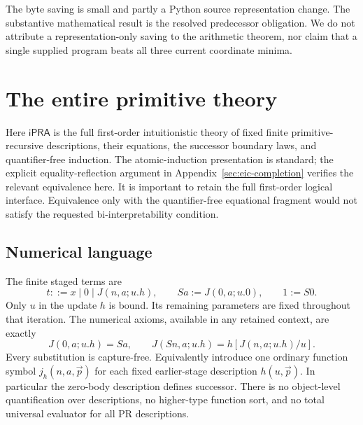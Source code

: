 \documentclass[11pt,letterpaper]{article}
\theoremstyle{definition}\newtheorem{definition}[theorem]{Definition}
\theoremstyle{remark}\newtheorem{remark}[theorem]{Remark}
\newcommand{\ipra}{\mathsf{iPRA}}
\begin{document}
The byte saving is small and partly a Python source representation change.
The substantive mathematical result is the resolved predecessor
obligation. We do not attribute a representation-only saving to the
arithmetic theorem, nor claim that a single supplied program beats all
three current coordinate minima.

\section{The entire primitive theory}
\label{sec:primitive}

Here $\ipra$ is the full first-order intuitionistic theory of fixed finite
primitive-recursive descriptions, their equations, the successor boundary
laws, and quantifier-free induction. The atomic-induction presentation is
standard\cite{salehi}; the explicit equality-reflection argument in
Appendix~\ref{sec:eic-completion} verifies the relevant equivalence here.
It is important to retain the full first-order logical interface.
Equivalence only with the quantifier-free equational fragment would not
satisfy the requested bi-interpretability condition.

\subsection{Numerical language}
The finite staged terms are
\[
 t::=x\mid0\mid J(n,a;u.h),\qquad Sa:=J(0,a;u.0),\qquad1:=S0.
\]
Only $u$ in the update $h$ is bound. Its remaining parameters are fixed
throughout that iteration. The numerical axioms, available in any retained
context, are exactly
\[
 J(0,a;u.h)=Sa,\qquad
 J(Sn,a;u.h)=h[J(n,a;u.h)/u].\tag{J0, JS}
\]
Every substitution is capture-free. Equivalently introduce one ordinary
function symbol $j_h(n,a,\vec p)$ for each fixed earlier-stage description
$h(u,\vec p)$. In particular the zero-body description defines successor.
There is no object-level quantification over descriptions, no higher-type
function sort, and no total universal evaluator for all PR descriptions.
\end{document}
